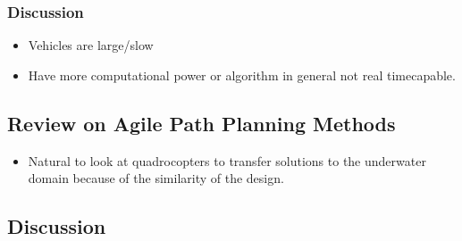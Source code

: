 \subsubsection{Discussion}
\begin{itemize}
    \color{red}
    \item Vehicles are large/slow
    \item Have more computational power or algorithm in general not real timecapable.
\end{itemize}

\subsection{Review on Agile Path Planning Methods}
\begin{itemize}
    \color{red}
    \item Natural to look at quadrocopters to transfer solutions to the underwater domain because of the similarity of the design.
\end{itemize}
\subsection{Discussion}
